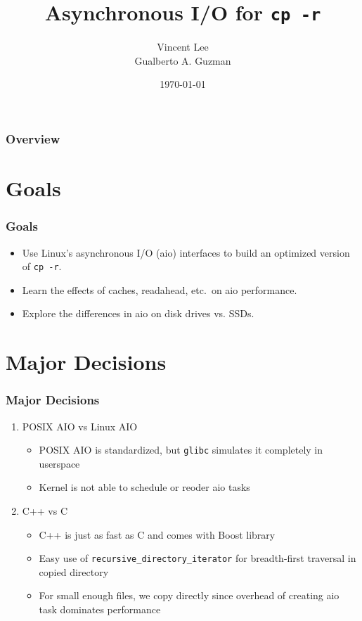 \documentclass{beamer}
\title[AIO for \texttt{cp -r}]{Asynchronous I/O for \texttt{cp -r}}
\author[V. Lee, G. Guzman]{Vincent Lee \\
	Gualberto A. Guzman}
\institute[UT Austin]{
    University of Texas at Austin \\
    \medskip
    \textit{vincent\_lee@utexas.edu, gualbertoguzman@utexas.edu}
}
\date{\today}
\begin{document}
\begin{frame}
    \titlepage
\end{frame}

\begin{frame}
    \frametitle{Overview}
    \tableofcontents
\end{frame}

\section{Goals}
\begin{frame}
    \frametitle{Goals}
    \begin{itemize}
	\item{Use Linux's asynchronous I/O (aio) interfaces to build an
	    optimized version of \texttt{cp -r}. }
	\item{Learn the effects of caches, readahead, etc.\ on aio performance. }
	\item{Explore the differences in aio on disk drives vs. SSDs. }
    \end{itemize}
\end{frame}

\section{Major Decisions}
\begin{frame}
    \frametitle{Major Decisions}
    \begin{enumerate}[1.]
	\item{POSIX AIO vs Linux AIO }
	    \begin{itemize}
		\item{POSIX AIO is standardized, but \texttt{glibc} simulates it
		    completely in userspace~\cite{aio7} }
		\item{Kernel is not able to schedule or reoder aio tasks }
	    \end{itemize}
	\item{C++ vs C }
	    \begin{itemize}
		\item{C++ is just as fast as C and comes with Boost library }
		\item{Easy use of \texttt{recursive\_directory\_iterator} for
		    breadth-first traversal in copied directory }
		\item{For small enough files, we copy directly since overhead of
		    creating aio task dominates performance }
	    \end{itemize}
    \end{enumerate}
\end{frame}
\end{document}
